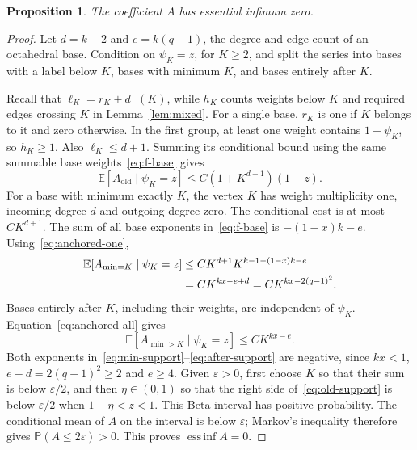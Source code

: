 \documentclass[11pt]{article}
\newtheorem{proposition}[theorem]{Proposition}
\theoremstyle{remark}\newtheorem{remark}[theorem]{Remark}
\DeclareMathOperator{\essinf}{ess\,inf}
\newcommand{\E}{\mathbb E}
\newcommand{\Prob}{\mathbb P}
\begin{document}
\begin{proposition}\label{prop:support}
The coefficient $A$ has essential infimum zero.
\end{proposition}
\begin{proof}
Let $d=k-2$ and $e=k(q-1)$, the degree and edge count of an octahedral
base. Condition on $\psi_K=z$, for $K\ge2$, and split the series into
bases with a label below $K$, bases with minimum $K$, and bases entirely
after $K$.

Recall that $\ell_K=r_K+d_-(K)$, while $h_K$ counts weights below $K$
and required edges crossing $K$ in Lemma~\ref{lem:mixed}. For a single base,
$r_K$ is one if $K$ belongs to it and zero otherwise.
In the first group, at least one weight contains $1-\psi_K$, so $h_K\ge1$.
Also $\ell_K\le d+1$. Summing its conditional bound using the same
summable base weights~\eqref{eq:f-base} gives
\begin{equation}\label{eq:old-support}
 \E[A_{\mathrm{old}}\mid\psi_K=z]
 \le C(1+K^{d+1})(1-z).
\end{equation}
For a base with minimum exactly $K$, the vertex $K$ has weight
multiplicity one, incoming degree $d$ and outgoing degree zero. The
conditional cost is at most $C K^{d+1}$.
The sum of all base exponents in~\eqref{eq:f-base} is $-(1-x)k-e$.
Using~\eqref{eq:anchored-one},
\begin{align}
 \E[A_{\min=K}\mid\psi_K=z]
 &\le C K^{d+1}K^{k-1-(1-x)k-e}\notag\\
 &=C K^{kx-e+d}=C K^{kx-2(q-1)^2}.\label{eq:min-support}
\end{align}
Bases entirely after $K$, including their weights, are independent of
$\psi_K$. Equation~\eqref{eq:anchored-all} gives
\begin{equation}\label{eq:after-support}
 \E[A_{\min>K}\mid\psi_K=z]\le C K^{kx-e}.
\end{equation}
Both exponents in~\eqref{eq:min-support}--\eqref{eq:after-support} are
negative, since $kx<1$, $e-d=2(q-1)^2\ge2$ and $e\ge4$.
Given $\varepsilon>0$, first choose $K$ so that their sum is below
$\varepsilon/2$, and then $\eta\in(0,1)$ so that the right side
of~\eqref{eq:old-support} is below $\varepsilon/2$ when
$1-\eta<z<1$. This Beta interval has positive probability.
The conditional mean of $A$ on the interval is below $\varepsilon$;
Markov's inequality therefore gives
$\Prob(A\le2\varepsilon)>0$. This proves $\essinf A=0$.
\end{proof}
\end{document}
